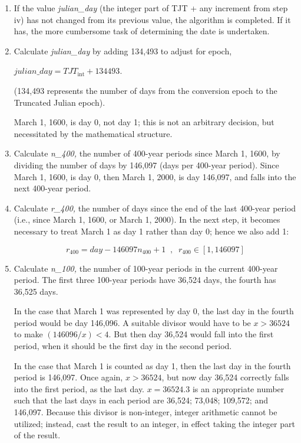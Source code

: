 {\begin{enumerate}
{\begin{enumerate}
\begin{enumerate}
\begin{equation*}
{hour}=\frac{{min}_{\text{int}}}{60},
\end{equation*}
\begin{equation*}
{minute}={min}_{\text{int}}-60\cdot {hour}.
\end{equation*}


\item If the value \textit{julian\_day }(the integer part of TJT + any
increment from step iv) has not changed from its previous value, the
algorithm is completed.  If it has, the more cumbersome task of
determining the date is undertaken.
\item Calculate \textit{julian\_day }by adding 134,493 to adjust for
epoch,

${julian}\text{\_}{day}={TJT}_{\text{int}}+134493$.

(134,493 represents the number of days from the conversion epoch to the
Truncated
Julian epoch).

March 1, 1600, is day 0, not day 1; this is not an
arbitrary decision, but necessitated by the mathematical structure.
\item Calculate \textit{n\_400,} the number of 400-year periods since
March 1, 1600, by dividing the number of days by 146,097 (days per
400-year period).  Since March 1, 1600, is day 0, then March 1, 2000, is
day 146,097, and falls into the next 400-year period.
\item  Calculate \textit{r\_400, }the number of days since the end of the last
400-year period (i.e., since March 1, 1600, or March 1, 2000).  In the next
step, it becomes necessary to treat March 1 as day 1 rather than day 0;
hence we also add 1:


\begin{equation*}
r_{400}={day}-146097n_{400}+1 \; \; , \; \; r_{400}\in [1,146097]
\end{equation*}


\item Calculate \textit{n\_100, }the number of 100-year periods in the
current 400-year period.  The first three 100-year periods have 36,524 days,
the fourth has 36,525 days.

In the case that March 1 was represented by day
0, the last day in the fourth period would be day
146,096.  A suitable divisor would have to be $x>36524$ to make
$(146096/x)<4$.  But then day 36,524 would fall into the first period,
when it should be the first day in the second period.

In the case that
March 1 is counted as day 1, then the last day in the
fourth period is 146,097.  Once again,  $x>36524$, but
now day 36,524 correctly falls into the first period, as the last day.
$x=36524.3$ is an appropriate number such that the last days in each
period are 36,524; 73,048; 109,572; and 146,097.  Because this divisor is
non-integer, integer arithmetic cannot be utilized; instead, cast the
result to an integer, in effect taking the integer part of the result.


\end{enumerate}
\end{enumerate}}
\end{enumerate}}
